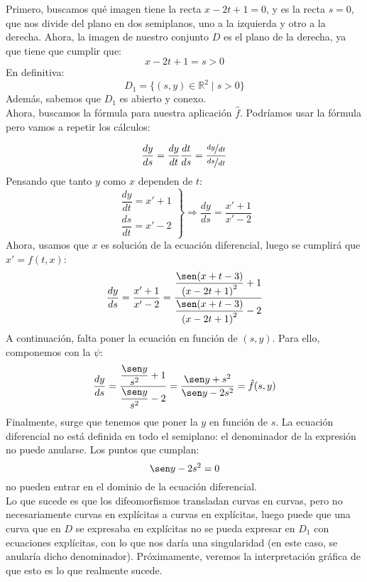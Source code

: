 \begin{ejemplo}
    Primero, buscamos qué imagen tiene la recta $x-2t+1=0$, y es la recta $s=0$, que nos divide del plano en dos semiplanos, uno a la izquierda y otro a la derecha. Ahora, la imagen de nuestro conjunto $D$ es el plano de la derecha, ya que tiene que cumplir que:
    \begin{equation*}
        x-2t+1 = s > 0
    \end{equation*}
    En definitiva:
    \begin{equation*}
        D_1 = \{(s,y)\in \mathbb{R}^2 \mid s>0\}
    \end{equation*}
    Además, sabemos que $D_1$ es abierto y conexo.\\

    Ahora, buscamos la fórmula para nuestra aplicación $\hat{f}$. Podríamos usar la fórmula pero vamos a repetir los cálculos:

    \begin{equation*}
        \dfrac{dy}{ds} = \dfrac{dy}{dt}\dfrac{dt}{ds} = \dfrac{\nicefrac{dy}{dt}}{\nicefrac{ds}{dt}}
    \end{equation*}
    Pensando que tanto $y$ como $x$ dependen de $t$:
    \begin{equation*}
        \left.\begin{array}{rl}
            \dfrac{dy}{dt} = x' + 1 \\
            \dfrac{ds}{dt} = x' - 2 
        \end{array}\right\} \Longrightarrow \dfrac{dy}{ds} = \dfrac{x'+1}{x'-2}
    \end{equation*}
    Ahora, usamos que $x$ es solución de la ecuación diferencial, luego se cumplirá que $x'=f(t,x)$:
    \begin{equation*}
        \dfrac{dy}{ds} = \dfrac{x'+1}{x'-2} = \dfrac{\dfrac{\sen(x+t-3)}{{(x-2t+1)}^{2}}+1}{\dfrac{\sen(x+t-3)}{{(x-2t+1)}^{2}}-2}
    \end{equation*}
    A continuación, falta poner la ecuación en función de $(s,y)$. Para ello, componemos con la $\psi$:
    \begin{equation*}
        \dfrac{dy}{ds} = \dfrac{\dfrac{\sen y}{s^2}+1}{\dfrac{\sen y}{s^2}-2} = \dfrac{\sen y+s^2}{\sen y -2s^2} = \hat{f}(s,y)
    \end{equation*}
Finalmente, surge que tenemos que poner la $y$ en función de $s$. La ecuación diferencial no está definida en todo el semiplano: el denominador de la expresión no puede anularse.
Los puntos que cumplan:
\begin{equation*}
    \sen y -2s^2 = 0
\end{equation*}
no pueden entrar en el dominio de la ecuación diferencial.\\

Lo que sucede es que los difeomorfismos transladan curvas en curvas, pero no necesariamente curvas en explícitas a curvas en explícitas, luego puede que una curva que en $D$ se expresaba en explícitas no se pueda expresar en $D_1$ con ecuaciones explícitas, con lo que nos daría una singularidad (en este caso, se anularía dicho denominador). Próximamente, veremos la interpretación gráfica de que esto es lo que realmente sucede.
\end{ejemplo}

